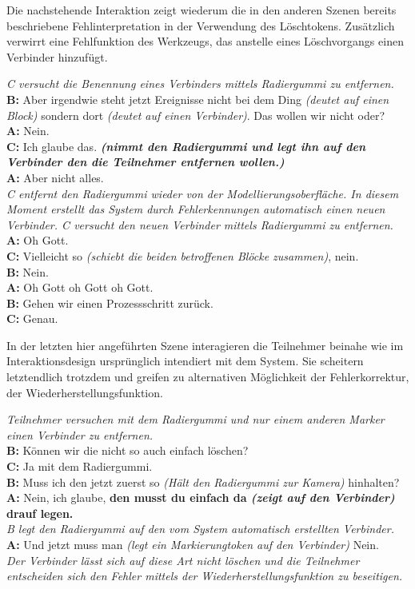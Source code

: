 Die nachstehende Interaktion zeigt wiederum die in den anderen Szenen bereits beschriebene Fehlinterpretation in der Verwendung des Löschtokens. Zusätzlich verwirrt eine Fehlfunktion des Werkzeugs, das anstelle eines Löschvorgangs einen Verbinder hinzufügt.

\begin{transkript}
	\emph{C versucht die Benennung eines Verbinders mittels Radiergummi zu entfernen.}\\
	\textbf{B:} Aber irgendwie steht jetzt Ereignisse nicht bei dem Ding \emph{(deutet auf einen Block)} sondern dort \emph{(deutet auf einen Verbinder)}. Das wollen wir nicht oder?\\
	\textbf{A:} Nein.\\
	\textbf{C:} Ich glaube das. \emph{\textbf{(nimmt den Radiergummi und legt ihn auf den Verbinder den die Teilnehmer entfernen wollen.)}}\\
	\textbf{A:} Aber nicht alles.\\
	\emph{C entfernt den Radiergummi wieder von der Modellierungsoberfläche. In diesem Moment erstellt das System durch Fehlerkennungen automatisch einen neuen Verbinder. C versucht den neuen Verbinder mittels Radiergummi zu entfernen.}\\
	\textbf{A:} Oh Gott.\\
	\textbf{C:} Vielleicht so \emph{(schiebt die beiden betroffenen Blöcke zusammen)}, nein.\\
	\textbf{B:} Nein.\\
	\textbf{A:} Oh Gott oh Gott oh Gott.\\
	\textbf{B:} Gehen wir einen Prozessschritt zurück.\\
	\textbf{C:} Genau.\\
\end{transkript}

In der letzten hier angeführten Szene interagieren die Teilnehmer beinahe wie im Interaktionsdesign ursprünglich intendiert mit dem System. Sie scheitern letztendlich trotzdem und greifen zu alternativen Möglichkeit der Fehlerkorrektur, der Wiederherstellungsfunktion.

\begin{transkript}
	\emph{Teilnehmer versuchen mit dem Radiergummi und nur einem anderen Marker einen Verbinder zu entfernen.}\\
	\textbf{B:} Können wir die nicht so auch einfach löschen?\\
	\textbf{C:} Ja mit dem Radiergummi.\\
	\textbf{B:} Muss ich den jetzt zuerst so \emph{(Hält den Radiergummi zur Kamera)} hinhalten?\\
	\textbf{A:} Nein, ich glaube, \textbf{den musst du einfach da \emph{(zeigt auf den Verbinder)} drauf legen.}\\
	\emph{B legt den Radiergummi auf den vom System automatisch erstellten Verbinder.}\\
	\textbf{A:} Und jetzt muss man \emph{(legt ein Markierungtoken auf den Verbinder)} Nein.\\
	\emph{Der Verbinder lässt sich auf diese Art nicht löschen und die Teilnehmer entscheiden sich den Fehler mittels der Wiederherstellungsfunktion zu beseitigen.}
\end{transkript}


